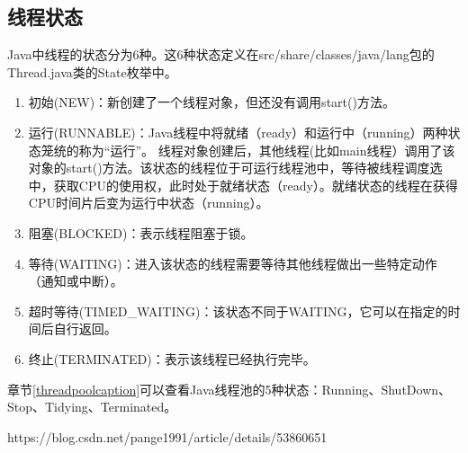 \documentclass[../../../interview-questions.tex]{subfiles}
\begin{document}
\subsection{线程状态}\label{threadcaption}

Java中线程的状态分为6种。这6种状态定义在src/share/classes/java/lang包的Thread.java类的State枚举中。

\begin{enumerate}
    \item {初始(NEW)：新创建了一个线程对象，但还没有调用start()方法。}
    \item {运行(RUNNABLE)：Java线程中将就绪（ready）和运行中（running）两种状态笼统的称为“运行”。
    线程对象创建后，其他线程(比如main线程）调用了该对象的start()方法。该状态的线程位于可运行线程池中，等待被线程调度选中，获取CPU的使用权，此时处于就绪状态（ready）。就绪状态的线程在获得CPU时间片后变为运行中状态（running）。}
    \item {阻塞(BLOCKED)：表示线程阻塞于锁。}
    \item {等待(WAITING)：进入该状态的线程需要等待其他线程做出一些特定动作（通知或中断）。}
    \item {超时等待(TIMED\_WAITING)：该状态不同于WAITING，它可以在指定的时间后自行返回。}
    \item {终止(TERMINATED)：表示该线程已经执行完毕。}
\end{enumerate}

章节\ref{threadpoolcaption}可以查看Java线程池的5种状态：Running、ShutDown、Stop、Tidying、Terminated。

https://blog.csdn.net/pange1991/article/details/53860651
\end{document}
